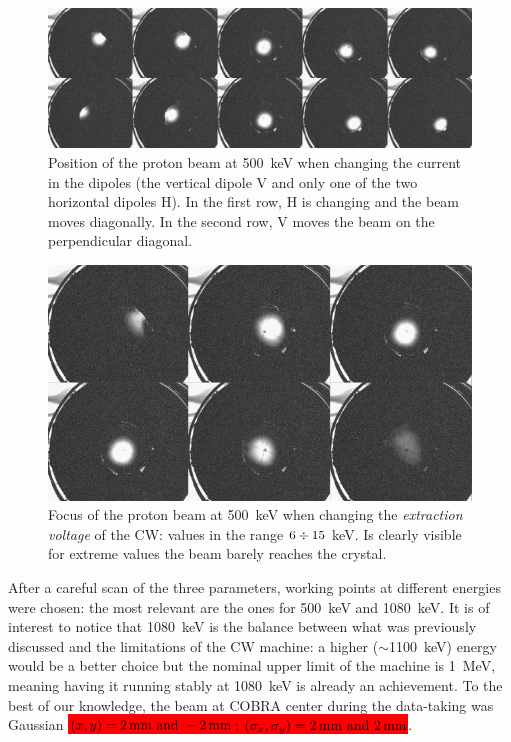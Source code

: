 \begin{refsection}
        \begin{figure}
            \centering
            \includegraphics[width = \textwidth]{Figures/X17/beamtuning/psotion_500keV.png}
            \caption{Position of the proton beam at \SI{500}{keV} when changing the current in the dipoles (the vertical dipole V and only one of the two horizontal dipoles H). In the first row, H is changing and the beam moves diagonally. In the second row, V moves the beam on the perpendicular diagonal.}
            \label{fig:position_500keV}
        \end{figure}
        \begin{figure}
            \centering
            \includegraphics[width = \textwidth]{Figures/X17/beamtuning/focus_500keV.png}
            \caption{Focus of the proton beam at \SI{500}{keV} when changing the \textit{extraction voltage} of the CW: values in the range $6\divisionsymbol15$ keV. Is clearly visible for extreme values the beam barely reaches the crystal.}
            \label{fig:focus_500keV}
        \end{figure}
        \noindent
        After a careful scan of the three parameters, working points at different energies were chosen: the most relevant are the ones for \SI{500}{keV} and \SI{1080}{keV}.
        It is of interest to notice that \SI{1080}{keV} is the balance between what was previously discussed and the limitations of the CW machine: a higher ($\sim$\SI{1100}{keV}) energy would be a better choice but the nominal upper limit of the machine is \SI{1}{MeV}, meaning having it running stably at \SI{1080}{keV} is already an achievement.
        To the best of our knowledge, the beam at COBRA center during the data-taking was Gaussian \colorbox{red}{$(x, y) = \SIlist{2; -2}{mm}$; $(\sigma_x, \sigma_y) = \SIlist{2; 2}{mm}$}.


\end{refsection}
